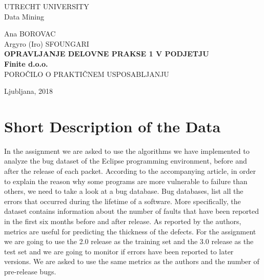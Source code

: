 \documentclass[a4paper,12pt]{article}
\begin{document}
\thispagestyle{empty}
\setlength{\parindent}{0em}

UTRECHT UNIVERSITY \\

Data Mining \\[40mm]

\begin{center}
Ana BOROVAC \\
Argyro (Iro) SFOUNGARI \\[3mm]
\textbf{
OPRAVLJANJE DELOVNE PRAKSE 1 V PODJETJU \\[1mm]
Finite d.o.o.} \\[15mm]

POROČILO O PRAKTIČNEM USPOSABLJANJU \\
\end{center}

\vfill

Ljubljana, 2018


\newpage

\tableofcontents

\section{Short Description of the Data}
 In the assignment we are asked to use the algorithms we have implemented to analyze the bug dataset of the Eclipse programming environment, before and after the release of each packet. According to the accompanying article, in order to explain the reason why some programs are more vulnerable to failure than others, we need to take a look at a bug database. Bug databases, list all the errors that occurred during the lifetime of a software. More specifically, the dataset contains information about the number of faults that have been reported in the first six months before and after release. As reported by the authors, metrics are useful for predicting the thickness of the defects. For the assignment we are going to use the 2.0 release as the training set and the 3.0 release as the test set and we are going to monitor if errors have been reported to later versions. We are asked to use the same metrics as the authors and the number of pre-release bugs. 
 
\end{document}
